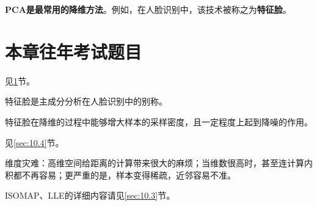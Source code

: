 \textbf{PCA是最常用的降维方法}。例如，在人脸识别中，该技术被称之为\textbf{特征脸}。

\section{本章往年考试题目}\label{sec:10.5}

见\ref{sec:10.5}节。

特征脸是主成分分析在人脸识别中的别称。

特征脸在降维的过程中能够增大样本的采样密度，且一定程度上起到降噪的作用。

见\ref{sec:10.4}节。

维度灾难：高维空间给距离的计算带来很大的麻烦；当维数很高时，甚至连计算内积都不再容易；更严重的是，样本变得稀疏，近邻容易不准。

ISOMAP、LLE的详细内容请见\ref{sec:10.3}节。